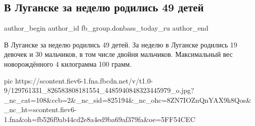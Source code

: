  
 
 
 
 
 
\subsection{В Луганске за неделю родились 49 детей}
\label{sec:07_12_2020.fb.fb_group.donbass_today_ru.1.lugansk_deti}
\ifcmt
	author_begin
   author_id fb_group.donbass_today_ru
	author_end
\fi


В Луганске за неделю родились 49 детей. За неделю в Луганске родились 19
девочек и 30 мальчиков, в том числе двойня мальчиков. Максимальный вес
новорождённого 4 килограмма 100 грамм.

\ifcmt
pic https://scontent.fiev6-1.fna.fbcdn.net/v/t1.0-9/129761331_826583808181554_4485940848323445979_o.jpg?_nc_cat=108&ccb=2&_nc_sid=825194&_nc_ohc=8ZN7IOZnQnYAX9k8Qos&_nc_ht=scontent.fiev6-1.fna&oh=fb526f9ab44cd2e8a4ed9ba69af379fa&oe=5FF54CEC
\fi

